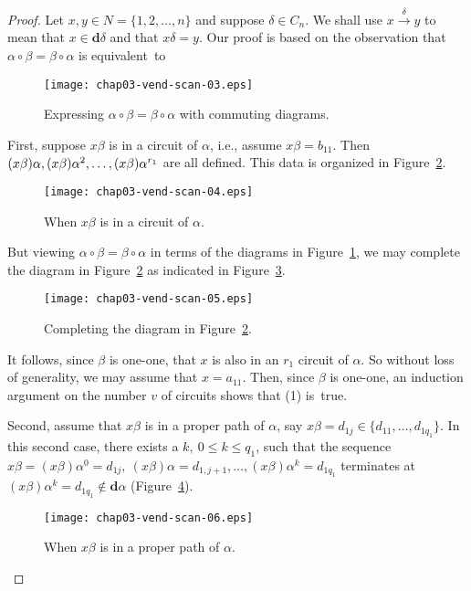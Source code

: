 \documentclass{surv-l}
\numberwithin{equation}{section}
\numberwithin{table}{section}
\numberwithin{figure}{section}
\theoremstyle{definition}
\begin{document}
\begin{proof} Let $x, y\in N=\{1,2,\ldots, n\}$ and suppose $\delta\in
C_{n}$. We shall use $x\xrightarrow{\delta} y$ to mean that $ x\in
\mathbf{d}\delta$ and that $x\delta=y$. Our proof is based on the
observation that $\alpha\circ\beta=\beta \circ\alpha$ is
equivalent~to
\setcounter{figure}{1}
\begin{figure}[!h]
\texttt{[image: chap03-vend-scan-03.eps]}
\caption{Expressing $\alpha \circ\beta=\beta \circ\alpha$ with commuting
diagrams.\label{fig3.10.2}}
\end{figure}

\noindent First, suppose $x\beta$ is in a circuit of $\alpha$, i.e., assume
$x\beta=b_{11}$. Then $(x\beta)\alpha,(x\beta)\alpha^{2},\ldots,\break
(x\beta)\alpha^{r_{1}}$ are all defined. This data is organized in
Figure~\ref{fig3.10.3}.

\begin{figure}[!h]
\texttt{[image: chap03-vend-scan-04.eps]}
\caption{When $ x\beta$ is in a circuit of $\alpha$.\label{fig3.10.3}}
\end{figure}

\noindent But viewing $\alpha \circ\beta=\beta \circ\alpha$ in terms of the
diagrams in Figure~\ref{fig3.10.2}, we may complete the diagram in
Figure~\ref{fig3.10.3} as indicated in Figure~\ref{fig3.10.4}.

\begin{figure}[!h]
\texttt{[image: chap03-vend-scan-05.eps]}
\caption{Completing the diagram in Figure~\ref{fig3.10.3}.\label{fig3.10.4}}
\end{figure}

\noindent It follows, since $\beta$ is one-one, that $x$ is also in an
$r_{1}$ circuit of $\alpha$. So without loss of generality, we may
assume that $x=a_{11}$. Then, since $\beta$ is one-one, an
induction argument on the number $v$ of circuits shows that (1)
is~true.

Second, assume that $ x\beta$ is in a proper path of $\alpha$, say
$x\beta=d_{1j}\in\{d_{11},\ldots,d_{1q_{1}}\}$. In this second
case, there exists a $k,\ 0\leq k\leq q_{1}$, such that the
sequence $x\beta=(x\beta)\alpha^{0}=d_{1j},\
(x\beta)\alpha=d_{1,j+1},\ldots, (x\beta)\alpha^{k}=d_{1q_{1}}$
terminates at $(x\beta)\alpha^{k}=d_{1q_{1}}\not\in
\mathbf{d}\alpha$ (Figure~\ref{fig3.10.5}).

\begin{figure}[!h]
\texttt{[image: chap03-vend-scan-06.eps]}
\caption{When $ x\beta$ is in a proper path of $\alpha$.\label{fig3.10.5}}
\end{figure}


\end{proof}
\end{document}
